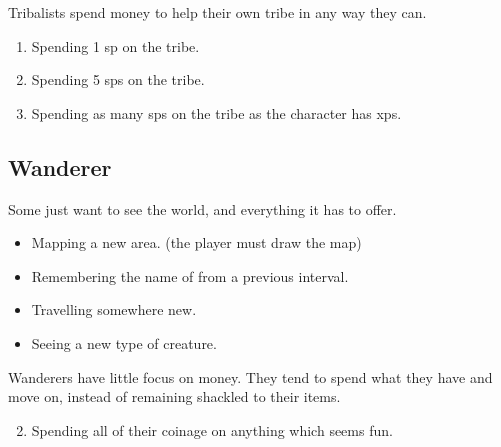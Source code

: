 \begin{multicols}{2}
Tribalists spend money to help their own tribe in any way they can.

\begin{enumerate}
  \item
  Spending 1 \gls{sp} on the tribe.
  \item
  Spending 5 \glspl{sp} on the tribe.
  \item
  Spending as many \glspl{sp} on the tribe as the character has \glspl{xp}.
\end{enumerate}

\subsection{Wanderer}

Some just want to see the world, and everything it has to offer.

\begin{itemize}

  \item
  Mapping a new area. (the player must draw the map)
  \item
  Remembering the name of  from a previous \gls{interval}.
  \item
  Travelling somewhere new.
  \item
  Seeing a new type of creature.

\end{itemize}

Wanderers have little focus on money.
They tend to spend what they have and move on, instead of remaining shackled to their items.

\begin{enumerate}
  \setcounter{enumi}{1}
  \item
  Spending all of their coinage on anything which seems fun.
\end{enumerate}


\end{multicols}

\section{}
\label{xpCosts}

